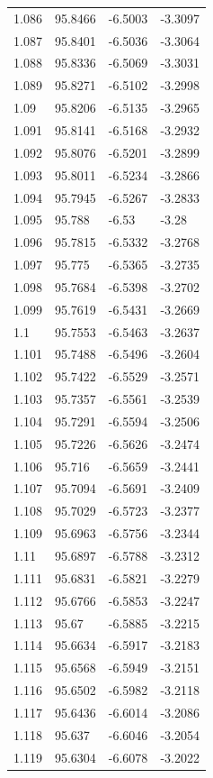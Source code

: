 \begin{tabular}{llll}
1.086 & 95.8466 & -6.5003 & -3.3097 \\
1.087 & 95.8401 & -6.5036 & -3.3064 \\
1.088 & 95.8336 & -6.5069 & -3.3031 \\
1.089 & 95.8271 & -6.5102 & -3.2998 \\
1.09 & 95.8206 & -6.5135 & -3.2965 \\
1.091 & 95.8141 & -6.5168 & -3.2932 \\
1.092 & 95.8076 & -6.5201 & -3.2899 \\
1.093 & 95.8011 & -6.5234 & -3.2866 \\
1.094 & 95.7945 & -6.5267 & -3.2833 \\
1.095 & 95.788 & -6.53 & -3.28 \\
1.096 & 95.7815 & -6.5332 & -3.2768 \\
1.097 & 95.775 & -6.5365 & -3.2735 \\
1.098 & 95.7684 & -6.5398 & -3.2702 \\
1.099 & 95.7619 & -6.5431 & -3.2669 \\
1.1 & 95.7553 & -6.5463 & -3.2637 \\
1.101 & 95.7488 & -6.5496 & -3.2604 \\
1.102 & 95.7422 & -6.5529 & -3.2571 \\
1.103 & 95.7357 & -6.5561 & -3.2539 \\
1.104 & 95.7291 & -6.5594 & -3.2506 \\
1.105 & 95.7226 & -6.5626 & -3.2474 \\
1.106 & 95.716 & -6.5659 & -3.2441 \\
1.107 & 95.7094 & -6.5691 & -3.2409 \\
1.108 & 95.7029 & -6.5723 & -3.2377 \\
1.109 & 95.6963 & -6.5756 & -3.2344 \\
1.11 & 95.6897 & -6.5788 & -3.2312 \\
1.111 & 95.6831 & -6.5821 & -3.2279 \\
1.112 & 95.6766 & -6.5853 & -3.2247 \\
1.113 & 95.67 & -6.5885 & -3.2215 \\
1.114 & 95.6634 & -6.5917 & -3.2183 \\
1.115 & 95.6568 & -6.5949 & -3.2151 \\
1.116 & 95.6502 & -6.5982 & -3.2118 \\
1.117 & 95.6436 & -6.6014 & -3.2086 \\
1.118 & 95.637 & -6.6046 & -3.2054 \\
1.119 & 95.6304 & -6.6078 & -3.2022 \\

\end{tabular}
